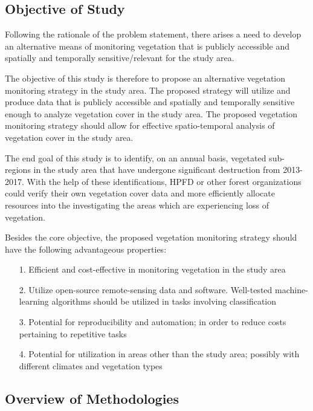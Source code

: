 \subsection{Objective of Study}

\justify
Following the rationale of the problem statement, there arises a need to develop an alternative means of monitoring vegetation that is publicly accessible and spatially and temporally sensitive/relevant for the study area. 

\justify
The objective of this study is therefore to propose an alternative vegetation monitoring strategy in the study area. The proposed strategy will utilize and produce data that is publicly accessible and spatially and temporally sensitive enough to analyze vegetation cover in the study area. The proposed vegetation monitoring strategy should allow for effective spatio-temporal analysis of vegetation cover in the study area.

\justify
The end goal of this study is to identify, on an annual basis, vegetated sub-regions in the study area that have undergone significant destruction from 2013-2017. With the help of these identifications, HPFD or other forest organizations could verify their own vegetation cover data and more efficiently allocate resources into the investigating the areas which are experiencing loss of vegetation.

\justify
Besides the core objective, the proposed vegetation monitoring strategy should have the following advantageous properties:
\begin{itemize}
	\item [1.] Efficient and cost-effective in monitoring vegetation in the study area
	\item [2.] Utilize open-source remote-sensing data and software. Well-tested machine-learning algorithms should be utilized in tasks involving classification
	\item [3.] Potential for reproducibility and automation; in order to reduce costs pertaining to repetitive tasks
	\item [4.] Potential for utilization in areas other than the study area; possibly with different climates and vegetation types
\end{itemize}

\subsection{Overview of Methodologies}

